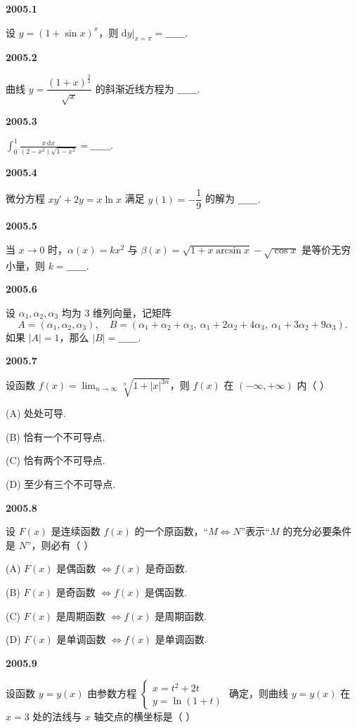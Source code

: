 \documentclass[UTF8,12pt,fontset=windows]{ctexart}
\begin{document}
{\large\bfseries 2005.1}

设 $y = (1+\sin x)^x$，则 $\mathrm{d}y\big|_{x=\pi} = \_\_\_\_\_\_$.

\vfill
\newpage
{\large\bfseries 2005.2}

曲线 $y = \dfrac{(1+x)^{\frac{3}{2}}}{\sqrt{x}}$ 的斜渐近线方程为 $\_\_\_\_\_\_.$

\vfill
\newpage
{\large\bfseries 2005.3}

$\displaystyle\int_0^1 \frac{x\,\mathrm{d}x}{(2-x^2)\sqrt{1-x^2}} = \_\_\_\_\_\_.$

\vfill
\newpage
{\large\bfseries 2005.4}

微分方程 $xy'+2y = x\ln x$ 满足 $y(1) = -\dfrac{1}{9}$ 的解为 $\_\_\_\_\_\_.$

\vfill
\newpage
{\large\bfseries 2005.5}

当 $x \to 0$ 时，$\alpha(x) = kx^2$ 与 $\beta(x) = \sqrt{1+x\arcsin x} - \sqrt{\cos x}$ 是等价无穷小量，则 $k = \_\_\_\_\_\_.$

\vfill
\newpage
{\large\bfseries 2005.6}

设 $\alpha_1,\alpha_2,\alpha_3$ 均为 3 维列向量，记矩阵
$$A = (\alpha_1,\alpha_2,\alpha_3),\quad B = (\alpha_1+\alpha_2+\alpha_3,\ \alpha_1+2\alpha_2+4\alpha_3,\ \alpha_1+3\alpha_2+9\alpha_3).$$
如果 $|A| = 1$，那么 $|B| = \_\_\_\_\_\_.$

\vfill
\newpage
{\large\bfseries 2005.7}

设函数 $f(x) = \lim_{n \to \infty} \sqrt[n]{1+|x|^{3n}}$，则 $f(x)$ 在 $(-\infty,+\infty)$ 内（ ）

(A) 处处可导.

(B) 恰有一个不可导点.

(C) 恰有两个不可导点.

(D) 至少有三个不可导点.

\vfill
\newpage
{\large\bfseries 2005.8}

设 $F(x)$ 是连续函数 $f(x)$ 的一个原函数，“$M \Leftrightarrow N$”表示“$M$ 的充分必要条件是 $N$”，则必有（ ）

(A) $F(x)$ 是偶函数 $\Leftrightarrow f(x)$ 是奇函数.

(B) $F(x)$ 是奇函数 $\Leftrightarrow f(x)$ 是偶函数.

(C) $F(x)$ 是周期函数 $\Leftrightarrow f(x)$ 是周期函数.

(D) $F(x)$ 是单调函数 $\Leftrightarrow f(x)$ 是单调函数.

\vfill
\newpage
{\large\bfseries 2005.9}

设函数 $y = y(x)$ 由参数方程 $\begin{cases} x = t^2+2t \\ y = \ln(1+t) \end{cases}$ 确定，则曲线 $y = y(x)$ 在 $x = 3$ 处的法线与 $x$ 轴交点的横坐标是（ ）
\end{document}
